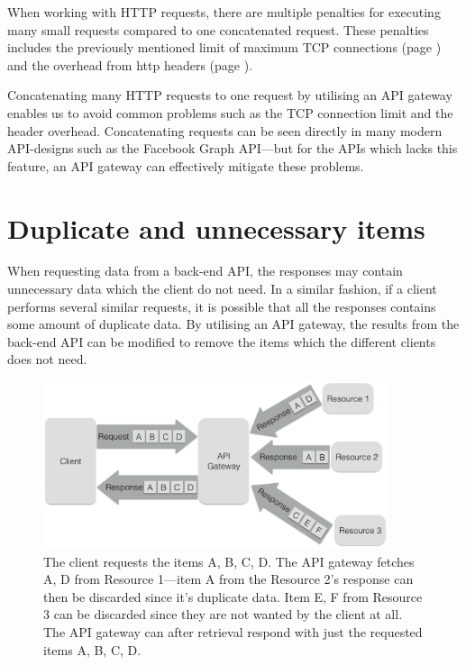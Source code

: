 \documentclass{cslthse-msc}
\begin{document}
When working with HTTP requests, there are multiple penalties for executing many small requests compared to one concatenated request. These penalties includes the previously mentioned limit of maximum TCP connections (page \pageref{max_tcp}) and the overhead from http headers (page \pageref{headers}). 

Concatenating many HTTP requests to one request by utilising an API gateway enables us to avoid common problems such as the TCP connection limit and the header overhead. Concatenating requests can be seen directly in many modern API-designs such as the Facebook Graph API\cite{facebook_batch_requests}---but for the APIs which lacks this feature, an API gateway can effectively mitigate these problems.

\section{Duplicate and unnecessary items}
When requesting data from a back-end API, the responses may contain unnecessary data which the client do not need. In a similar fashion, if a client performs several similar requests, it is possible that all the responses contains some amount of duplicate data. By utilising an API gateway, the results from the back-end API can be modified to remove the items which the different clients does not need.

\begin{figure}[H]
  \centering
    \begin{center}
      \includegraphics[width=0.9\textwidth]{images/api_gateway_duplicate.png}
    \end{center}
  \caption{The client requests the items A, B, C, D. The API gateway fetches A, D from Resource 1---item A from the Resource 2's response can then be discarded since it's duplicate data. Item E, F from Resource 3 can be discarded since they are not wanted by the client at all. The API gateway can after retrieval respond with just the requested items A, B, C, D.}
\end{figure}
\end{document}
